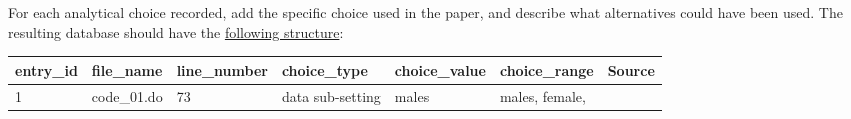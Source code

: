 \documentclass[]{book}
\begin{document}
For each analytical choice recorded, add the specific choice used in the paper, and describe what alternatives could have been used. The resulting database should have the \href{https://docs.google.com/spreadsheets/d/1nZuJSHswbZgaaIfBcyIUGPwG-WIP8zE1Oambud-WoDc/edit?usp=sharing}{following structure}:

\begin{longtable}[]{@{}lllllll@{}}
\toprule
\begin{minipage}[b]{0.05\columnwidth}\raggedright
entry\_id\strut
\end{minipage} & \begin{minipage}[b]{0.07\columnwidth}\raggedright
file\_name\strut
\end{minipage} & \begin{minipage}[b]{0.08\columnwidth}\raggedright
line\_number\strut
\end{minipage} & \begin{minipage}[b]{0.12\columnwidth}\raggedright
choice\_type\strut
\end{minipage} & \begin{minipage}[b]{0.19\columnwidth}\raggedright
choice\_value\strut
\end{minipage} & \begin{minipage}[b]{0.18\columnwidth}\raggedright
choice\_range\strut
\end{minipage} & \begin{minipage}[b]{0.12\columnwidth}\raggedright
Source\strut
\end{minipage}\tabularnewline
\midrule
\endhead
\begin{minipage}[t]{0.05\columnwidth}\raggedright
1\strut
\end{minipage} & \begin{minipage}[t]{0.07\columnwidth}\raggedright
code\_01.do\strut
\end{minipage} & \begin{minipage}[t]{0.08\columnwidth}\raggedright
73\strut
\end{minipage} & \begin{minipage}[t]{0.12\columnwidth}\raggedright
data sub-setting\strut
\end{minipage} & \begin{minipage}[t]{0.19\columnwidth}\raggedright
males\strut
\end{minipage} & \begin{minipage}[t]{0.18\columnwidth}\raggedright
males, female,\strut
\end{minipage} & \begin{minipage}[t]{0.12\columnwidth}\raggedright

\end{minipage}
\end{longtable}
\end{document}
